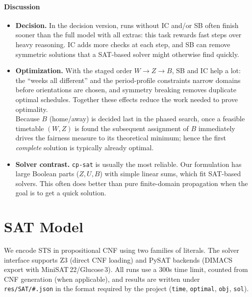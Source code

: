 \documentclass{article}
\begin{document}
\paragraph{Discussion}
\begin{itemize}\setlength{\itemsep}{2pt}
  \item \textbf{Decision.}
        In the decision version, runs without IC and/or SB often finish sooner
        than the full model with all extras: this task rewards fast steps over
        heavy reasoning. IC adds more checks at each step, and SB can remove
        symmetric solutions that a SAT-based solver might otherwise find quickly.
  \item \textbf{Optimization.}
        With the staged order \(W\!\rightarrow\!Z\!\rightarrow\!B\), SB and IC help a
        lot: the “weeks all different” and the period-profile constraints narrow
        domains before orientations are chosen, and symmetry breaking removes
        duplicate optimal schedules. Together these effects reduce the work needed
        to prove optimality.\\
        Because \(B\) (home/away) is decided last in the phased search, once a feasible
        timetable \((W,Z)\) is found the subsequent assignment of \(B\) immediately drives
        the fairness measure to its theoretical minimum; hence the first \emph{complete}
        solution is typically already optimal.
  \item \textbf{Solver contrast.}
        \texttt{cp-sat} is usually the most reliable. Our formulation has large
        Boolean parts (\(Z,U,B\)) with simple linear sums, which fit SAT-based
        solvers. This often does better than pure
        finite-domain propagation when the goal is to get a quick solution.

\end{itemize}


\section{SAT Model}

We encode STS in propositional CNF using two families of literals. The solver
interface supports Z3 (direct CNF loading) and PySAT backends (DIMACS export
with MiniSAT\,22/Glucose\,3). All runs use a $300$s time limit, counted from
CNF generation (when applicable), and results are written under
\texttt{res/SAT/\#.json} in the format required by the project
(\texttt{time}, \texttt{optimal}, \texttt{obj}, \texttt{sol}).
\end{document}
